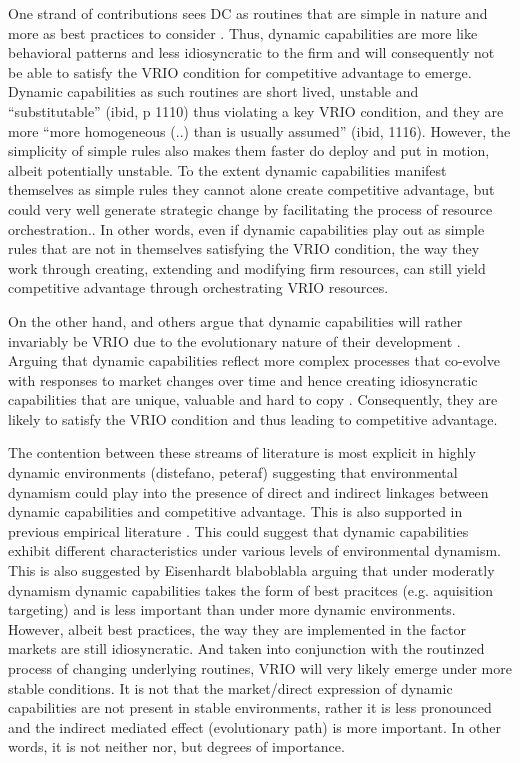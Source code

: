 One strand of contributions sees DC as routines that are simple in nature and more as best
practices to consider \citep{Eisenhardt2000}. Thus, dynamic capabilities are more like
behavioral patterns and less idiosyncratic to the firm and will consequently not be able
to satisfy the VRIO condition for competitive advantage to emerge. Dynamic capabilities as
such routines are short lived, unstable and “substitutable” (ibid, p 1110) thus violating
a key VRIO condition, and they are more “more homogeneous (..) than is usually assumed”
(ibid, 1116). However, the simplicity of simple rules also makes them faster do deploy and
put in motion, albeit potentially unstable. To the extent dynamic capabilities manifest
themselves as simple rules they cannot alone create competitive advantage, but could very
well generate strategic change by facilitating the process of resource orchestration.. In
other words, even if dynamic capabilities play out as simple rules that are not in
themselves satisfying the VRIO condition, the way they work through creating, extending
and modifying firm resources, can still yield competitive advantage through orchestrating
VRIO resources.

On the other hand, \cite{Teece1997} and others \cite{Helfat2007} argue that dynamic
capabilities will rather invariably be VRIO due to the evolutionary nature of their
development \citep{Arndt2018,Peteraf2013}. Arguing that dynamic capabilities reflect more
complex processes that co-evolve with responses to market changes over time and hence
creating idiosyncratic capabilities that are unique, valuable and hard to copy
\citep{Helfat2007,Arndt2018}. Consequently, they are likely to satisfy the VRIO condition
and thus leading to competitive advantage.

The contention between these streams of literature is most explicit in highly dynamic
environments (distefano, peteraf) suggesting that environmental dynamism could play into
the presence of direct and indirect linkages between dynamic capabilities and competitive
advantage. This is also supported in previous empirical literature \citep{Schilke2014}.
This could suggest that dynamic capabilities exhibit different characteristics under
various levels of environmental dynamism. This is also suggested by Eisenhardt blaboblabla
arguing that under moderatly dynamism dynamic capabilities takes the form of best
pracitces (e.g. aquisition targeting) and is less important than under more dynamic
environments. However, albeit best practices, the way they are implemented in the factor
markets are still idiosyncratic. And taken into conjunction with the routinzed process of
changing underlying routines, VRIO will very likely emerge under more stable
conditions. It is not that the market/direct expression of dynamic capabilities are not
present in stable environments, rather it is less pronounced and the indirect mediated
effect (evolutionary path) is more important. In other words, it is not neither nor, but
degrees of importance.

